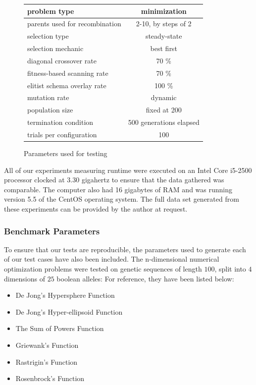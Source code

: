 \begin{figure}[h!]
\begin{center}
\begin{tabular}{ | l | c | }
\hline
problem type & minimization \\
\hline
parents used for recombination & 2-10, by steps of 2 \\
\hline
selection type & steady-state \\
\hline
selection mechanic & best first \\
\hline
diagonal crossover rate & 70 \% \\
\hline
fitness-based scanning rate & 70 \% \\
\hline
elitist schema overlay rate & 100 \% \\
\hline
mutation rate & dynamic \cite{Back93} \\
\hline
population size & fixed at 200 \\
\hline
termination condition & 500 generations elapsed \\
\hline
trials per configuration & 100 \\
\hline
\end{tabular}
\caption{Parameters used for testing}
\label{fig:GA-config}
\end{center}
\end{figure}

All of our experiments measuring runtime were executed on an Intel Core i5-2500 processor clocked at 3.30 gigahertz to ensure that the data gathered was comparable. The computer also had 16 gigabytes of RAM and was running version 5.5 of the CentOS operating system. The full data set generated from these experiments can be provided by the author at request.

\subsubsection*{Benchmark Parameters}
To ensure that our tests are reproducible, the parameters used to generate each of our test cases have also been included. The n-dimensional numerical optimization problems were tested on genetic sequences of length $100$, split into $4$ dimensions of $25$ boolean alleles: For reference, they have been listed below:

\begin{itemize}
\item De Jong's Hypersphere Function
\item De Jong's Hyper-ellipsoid Function
\item The Sum of Powers Function
\item Griewank's Function
\item Rastrigin's Function
\item Rosenbrock's Function
\end{itemize} 

